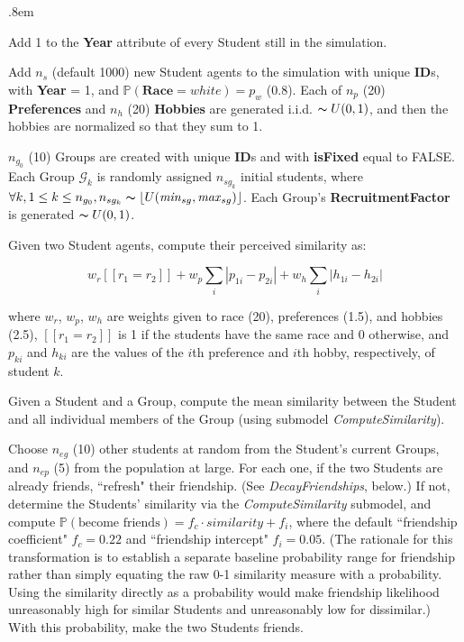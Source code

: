 \begin{description}
\itemsep.8em
\item[\textsl{IncrementYears}] Add 1 to the \textbf{Year} attribute of every Student
still in the simulation.

\item[\textsl{AddNewStudents}] Add $n_s$ (default 1000) new Student agents to the
simulation with unique \textbf{ID}s, with \textbf{Year} = 1, and
$\mathbb{P}(\textbf{Race}=white) = p_w$ (0.8). Each of $n_p$ (20)
\textbf{Preferences} and $n_h$ (20) \textbf{Hobbies} are generated i.i.d.
$\thicksim U(0,1)$, and then the hobbies are normalized so that they sum to 1.

\item[\textsl{AddNewGroups}] $n_{g_0}$ (10) Groups are created with unique
\textbf{ID}s and with \textbf{isFixed} equal to FALSE. Each Group
$\mathcal{G}_k$ is randomly assigned $n_{sg_k}$ initial students, where
$\forall k, 1\leq k\leq n_{g_0}, n_{sg_k} \thicksim \left\lfloor
U(\text{\textit{min}}_{sg},\text{\textit{max}}_{sg}) \right\rfloor$. Each
Group's \textbf{RecruitmentFactor} is generated $\thicksim U(0,1)$.

\item[\textsl{ComputeSimilarity}] Given two Student agents, compute their perceived
similarity as:

\[
w_r [\![r_1=r_2]\!] +
w_p \sum_i |p_{1i}-p_{2i}| + 
w_h \sum_i |h_{1i}-h_{2i}|
\]

where $w_r$, $w_p$, $w_h$ are weights given to race (20), preferences
(1.5), and hobbies (2.5), $[\![r_1=r_2]\!]$ is 1 if the students have the same
race and 0 otherwise, and $p_{ki}$ and $h_{ki}$ are the values of the $i$th
preference and $i$th hobby, respectively, of student $k$.

\item[\textsl{ComputeAffinity}] Given a Student and a Group, compute the mean
similarity between the Student and all individual members of the Group (using
submodel \textsl{ComputeSimilarity}).

\item[\textsl{EncounterOthers}] Choose $n_{eg}$ (10) other students at random
from the Student's current Groups, and $n_{ep}$ (5) from the population at
large. For each one, if the two Students are already friends, ``refresh" their
friendship. (See \textsl{DecayFriendships}, below.) If not, determine the
Students' similarity via the \textsl{ComputeSimilarity} submodel, and compute
$\mathbb{P}(\text{become friends})=f_c \cdot \textit{similarity} + f_i$, where
the default ``friendship coefficient" $f_c=0.22$ and ``friendship intercept"
$f_i=0.05$. (The rationale for this transformation is to establish a separate
baseline probability range for friendship rather than simply equating the raw
0-1 similarity measure with a probability. Using the similarity directly as a
probability would make friendship likelihood unreasonably high for similar
Students and unreasonably low for dissimilar.) With this probability, make the
two Students friends.


\end{description}
